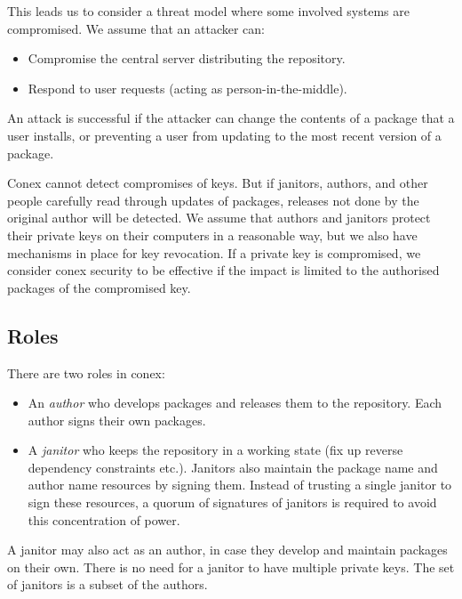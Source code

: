 \documentclass[nocopyrightspace]{sigplanconf}
\begin{document}
This leads us to consider a threat model where some involved systems are compromised.  We assume that an attacker can:
\begin{itemize}
  \item Compromise the central server distributing the repository.
  \item Respond to user requests (acting as person-in-the-middle).
\end{itemize}

An attack is successful if the attacker can change the contents of a package that a user installs, or preventing a user from updating to the most recent version of a package.


Conex cannot detect compromises of keys.  But if janitors, authors, and other people carefully read through updates of packages, releases not done by the original author will be detected.
We assume that authors and janitors protect their private keys on their computers in a reasonable way, but we also have mechanisms in place for key revocation.
If a private key is compromised, we consider conex security to be effective if the impact is limited to the authorised packages of the compromised key.

\subsection{Roles}
There are two roles in conex:
\begin{itemize}
  \item An \emph{author} who develops packages and releases them to the repository.  Each author signs their own packages.
  \item A \emph{janitor} who keeps the repository in a working state (fix up reverse dependency constraints etc.).  Janitors also maintain the package name and author name resources by signing them.  Instead of trusting a single janitor to sign these resources, a quorum of signatures of janitors is required to avoid this concentration of power.
\end{itemize}

A janitor may also act as an author, in case they develop and maintain packages on their own.  There is no need for a janitor to have multiple private keys.
The set of janitors is a subset of the authors.
\end{document}
